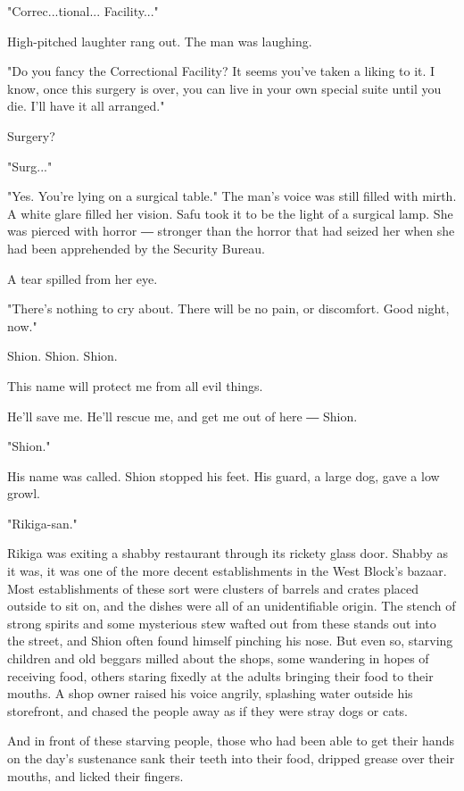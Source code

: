 "Correc...tional... Facility..."

High-pitched laughter rang out. The man was laughing.

"Do you fancy the Correctional Facility? It seems you've taken a liking
to it. I know, once this surgery is over, you can live in your own
special suite until you die. I'll have it all arranged."

Surgery?

"Surg..."

"Yes. You're lying on a surgical table." The man's voice was still
filled with mirth. A white glare filled her vision. Safu took it to be
the light of a surgical lamp. She was pierced with horror ― stronger
than the horror that had seized her when she had been apprehended by the
Security Bureau.

A tear spilled from her eye.

"There's nothing to cry about. There will be no pain, or discomfort.
Good night, now."

Shion. Shion. Shion.

This name will protect me from all evil things.

He'll save me. He'll rescue me, and get me out of here ― Shion.

"Shion."

His name was called. Shion stopped his feet. His guard, a large dog,
gave a low growl.

"Rikiga-san."

Rikiga was exiting a shabby restaurant through its rickety glass door.
Shabby as it was, it was one of the more decent establishments in the
West Block's bazaar. Most establishments of these sort were clusters of
barrels and crates placed outside to sit on, and the dishes were all of
an unidentifiable origin. The stench of strong spirits and some
mysterious stew wafted out from these stands out into the street, and
Shion often found himself pinching his nose. But even so, starving
children and old beggars milled about the shops, some wandering in hopes
of receiving food, others staring fixedly at the adults bringing their
food to their mouths. A shop owner raised his voice angrily, splashing
water outside his storefront, and chased the people away as if they were
stray dogs or cats.

And in front of these starving people, those who had been able to get
their hands on the day's sustenance sank their teeth into their food,
dripped grease over their mouths, and licked their fingers.

